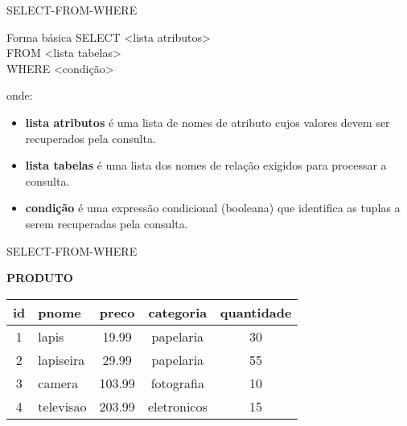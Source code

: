 \documentclass[aspectratio=169]{beamer}
\begin{document}
			\begin{frame}[fragile]{SELECT-FROM-WHERE}
				\begin{block}{Forma básica}
							{\ttfamily
							SELECT <lista atributos>\\
							FROM <lista tabelas>\\
							WHERE <condição>
							}
				\end{block}
				\noindent onde:
				\begin{itemize}
					\item \textbf{lista atributos} é uma lista de nomes de atributo cujos valores devem ser recuperados pela consulta.
					\item \textbf{lista tabelas} é uma lista dos nomes de relação exigidos para processar a consulta.
					\item \textbf{condição} é uma expressão condicional (booleana) que identifica as tuplas a serem recuperadas pela consulta.
				\end{itemize}
			\end{frame}

			\begin{frame}[fragile]{SELECT-FROM-WHERE}
				\begin{block}{\textbf{PRODUTO}}
					\begin{table}
						\begin{tabular}{|c|l|c|c|c|}
							\toprule
							\textbf{id} & \textbf{pnome} & \textbf{preco} & \textbf{categoria} & \textbf{quantidade} \\ \midrule
							     1      & lapis          &     19.99      &     papelaria      &         30          \\ \midrule
							     2      & lapiseira      &     29.99      &     papelaria      &         55          \\ \midrule
							     3      & camera         &     103.99     &     fotografia     &         10          \\ \midrule
							     4      & televisao      &     203.99     &    eletronicos     &         15          \\ \bottomrule
						\end{tabular}
					\end{table}
				\end{block}
			\end{frame}
		
\end{document}
